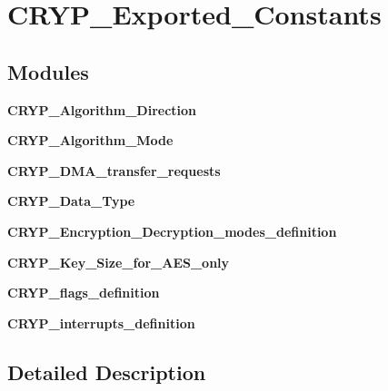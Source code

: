 \section{C\+R\+Y\+P\+\_\+\+Exported\+\_\+\+Constants}
\label{group__CRYP__Exported__Constants}
\subsection*{Modules}
\begin{DoxyCompactItemize}
\item 
\textbf{ C\+R\+Y\+P\+\_\+\+Algorithm\+\_\+\+Direction}
\item 
\textbf{ C\+R\+Y\+P\+\_\+\+Algorithm\+\_\+\+Mode}
\item 
\textbf{ C\+R\+Y\+P\+\_\+\+D\+M\+A\+\_\+transfer\+\_\+requests}
\item 
\textbf{ C\+R\+Y\+P\+\_\+\+Data\+\_\+\+Type}
\item 
\textbf{ C\+R\+Y\+P\+\_\+\+Encryption\+\_\+\+Decryption\+\_\+modes\+\_\+definition}
\item 
\textbf{ C\+R\+Y\+P\+\_\+\+Key\+\_\+\+Size\+\_\+for\+\_\+\+A\+E\+S\+\_\+only}
\item 
\textbf{ C\+R\+Y\+P\+\_\+flags\+\_\+definition}
\item 
\textbf{ C\+R\+Y\+P\+\_\+interrupts\+\_\+definition}
\end{DoxyCompactItemize}


\subsection{Detailed Description}
